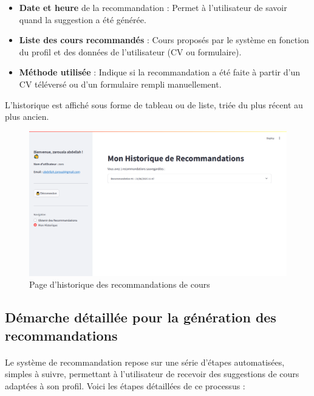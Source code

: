 \begin{itemize}
  \item \textbf{Date et heure} de la recommandation : Permet à l'utilisateur de savoir quand la suggestion a été générée.
  \item \textbf{Liste des cours recommandés} : Cours proposés par le système en fonction du profil et des données de l'utilisateur (CV ou formulaire).
  \item \textbf{Méthode utilisée} : Indique si la recommandation a été faite à partir d'un CV téléversé ou d'un formulaire rempli manuellement.
\end{itemize}

\medskip

\noindent L’historique est affiché sous forme de tableau ou de liste, triée du plus récent au plus ancien.

\vspace{0.5cm}
\hfill \break
\begin{figure}[h]
    \centering
    \includegraphics[width=\linewidth]{images/page_historique.png} %
    \caption{Page d’historique des recommandations de cours} 
\end{figure}


 \noindent

\newpage
\subsection*{Démarche détaillée pour la génération des recommandations}

\paragraph{}
Le système de recommandation repose sur une série d'étapes automatisées, simples à suivre, permettant à l’utilisateur de recevoir des suggestions de cours adaptées à son profil. Voici les étapes détaillées de ce processus :

